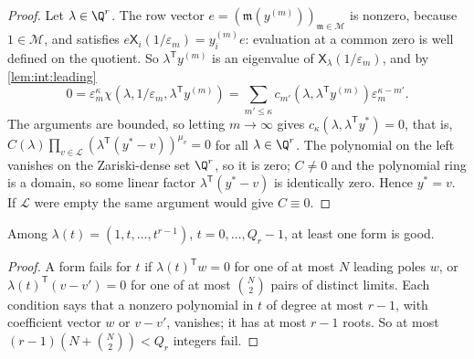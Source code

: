 \begin{proof}
Let $\lambda\in\Q^r$. The row vector $e=(\mathfrak m(y^{(m)}))_{\mathfrak m\in\mathcal M}$ is
nonzero, because $1\in\mathcal M$, and satisfies
$e\mathsf X_i(1/\varepsilon_m)=y^{(m)}_ie$: evaluation at a common zero is well defined
on the quotient. So $\lambda^{\mathsf T}y^{(m)}$ is an eigenvalue of
$\mathsf X_\lambda(1/\varepsilon_m)$, and by \cref{lem:int:leading}
\[
 0=\varepsilon_m^\kappa\chi(\lambda,1/\varepsilon_m,\lambda^{\mathsf T}y^{(m)})
 =\sum_{m'\le\kappa}c_{m'}(\lambda,\lambda^{\mathsf T}y^{(m)})\varepsilon_m^{\kappa-m'} .
\]
The arguments are bounded, so letting $m\to\infty$ gives
$c_\kappa(\lambda,\lambda^{\mathsf T}y^*)=0$, that is,
$C(\lambda)\prod_{v\in\mathcal L}(\lambda^{\mathsf T}(y^*-v))^{\mu_v}=0$ for all
$\lambda\in\Q^r$. The polynomial on the left vanishes on the Zariski-dense set
$\Q^r$, so it is zero; $C\ne0$ and the polynomial ring is a domain, so some
linear factor $\lambda^{\mathsf T}(y^*-v)$ is identically zero. Hence $y^*=v$.
If $\mathcal L$ were empty the same argument would give $C\equiv0$.
\end{proof}

\begin{lemma}\label{lem:int:forms}
Among $\lambda(t)=(1,t,\ldots,t^{r-1})$, $t=0,\ldots,Q_r-1$, at least one form is
good.
\end{lemma}

\begin{proof}
A form fails for $t$ if $\lambda(t)^{\mathsf T}w=0$ for one of at most $N$
leading poles $w$, or $\lambda(t)^{\mathsf T}(v-v')=0$ for one of at most
$\binom N2$ pairs of distinct limits. Each condition says that a nonzero
polynomial in $t$ of degree at most $r-1$, with coefficient vector $w$ or
$v-v'$, vanishes; it has at most $r-1$ roots. So at most
$(r-1)(N+\binom N2)<Q_r$ integers fail.
\end{proof}

